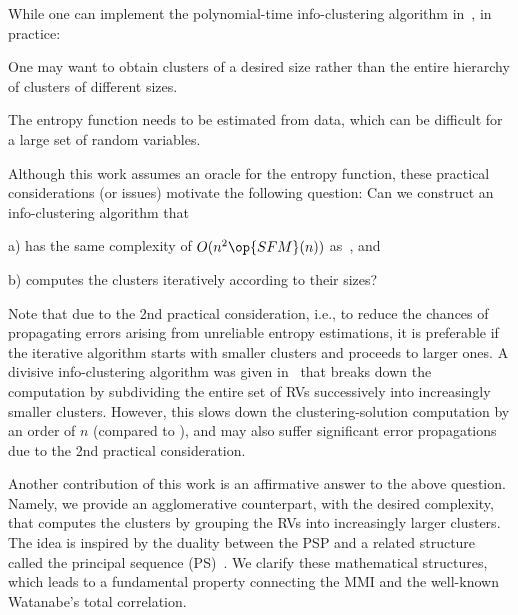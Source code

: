 While one can implement the polynomial-time info-clustering algorithm in~\cite[Algorithm~3]{chan16cluster}, in practice:
\begin{inparaenum}
	\item One may want to obtain clusters of a desired size rather than the entire hierarchy of clusters
	of different sizes. 
	\item The entropy function needs to be estimated from data, which can be
	difficult for a large set of random variables. 
\end{inparaenum}
%
%
Although this work assumes an oracle for the entropy function,
these practical considerations (or issues) motivate the following question:
Can we construct an info-clustering
algorithm that
\begin{inparaenum}
\item[a)] has the same complexity of $O(n^2 \op{SFM}(n))$ as~\cite[Algorithm~3]{chan16cluster}, and
\item[b)] computes the clusters iteratively according to their sizes?
\end{inparaenum}
Note that due to the 2nd practical consideration, i.e., to reduce the chances of propagating
errors arising from unreliable entropy estimations,  it is preferable if the iterative
algorithm starts with smaller clusters and proceeds to larger ones. A divisive
info-clustering algorithm was given in~\cite[Algorithms~1 \& 2]{chan16cluster} that breaks down the
computation by subdividing the entire set of RVs successively into increasingly smaller clusters.
However, this slows down the clustering-solution computation by an order of $n$ (compared to \cite[Algorithm~3]{chan16cluster}),
and may also suffer significant error propagations due to the 2nd practical consideration.

Another contribution of this work is an affirmative answer to the above question. 
Namely, we provide an agglomerative counterpart, with the desired complexity, that computes the 
clusters by grouping the RVs into increasingly larger clusters.
The idea is inspired by the duality between the PSP and a related structure called the
principal sequence (PS)~\cite{fujishige80,fujishige05,fujishige-pp-revisited}. We clarify these
mathematical structures, which leads to a fundamental property connecting the MMI and the well-known
Watanabe's total correlation. %

